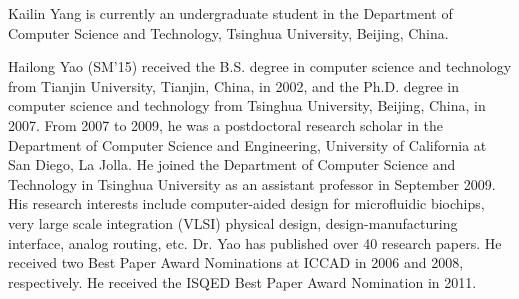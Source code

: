 \documentclass[journal]{IEEEtran}
\begin{document}
\begin{thebibliography}{99}
{%





}
\end{thebibliography}
\newpage
\vspace{-0.90cm}
\begin{IEEEbiography}{Kailin Yang}  is currently an undergraduate student in the Department of Computer Science and Technology, Tsinghua University, Beijing, China.
\end{IEEEbiography}

\begin{IEEEbiography}{Hailong Yao (SM'15)} received the B.S. degree 
in computer science and technology from Tianjin University, Tianjin, 
China, in 2002, and the Ph.D. degree in computer science 
and technology from Tsinghua University, Beijing, China, in 2007. 
From 2007 to 2009, he was a postdoctoral research 
scholar in the Department of Computer Science and Engineering, 
University of California at San Diego, La Jolla. He joined the 
Department of Computer Science and Technology in Tsinghua University 
as an assistant professor in September 2009. 
His research interests include computer-aided design for microfluidic biochips, very large scale integration (VLSI) physical design, design-manufacturing interface, analog routing, etc. Dr. Yao has published over 40 research papers. He received two Best Paper Award Nominations at ICCAD in 2006 and 2008, respectively. He received the ISQED Best Paper Award Nomination in 2011.
\end{IEEEbiography}
\end{document}
